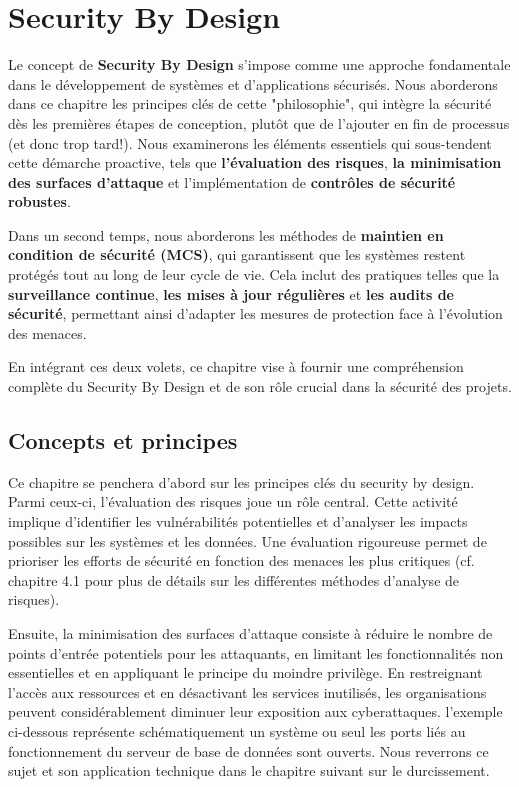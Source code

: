 \section{Security By Design}

Le concept de \textbf{Security By Design} s'impose comme une approche fondamentale dans le développement de systèmes et d'applications sécurisés. Nous aborderons dans ce chapitre les principes clés de cette "philosophie", qui intègre la sécurité dès les premières étapes de conception, plutôt que de l'ajouter en fin de processus (et donc trop tard!). Nous examinerons les éléments essentiels qui sous-tendent cette démarche proactive, tels que \textbf{l'évaluation des risques}, \textbf{la minimisation des surfaces d'attaque} et l'implémentation de \textbf{contrôles de sécurité robustes}.

Dans un second temps, nous aborderons les méthodes de \textbf{maintien en condition de sécurité (MCS)}, qui garantissent que les systèmes restent protégés tout au long de leur cycle de vie. Cela inclut des pratiques telles que la \textbf{surveillance continue}, \textbf{les mises à jour régulières} et \textbf{les audits de sécurité}, permettant ainsi d'adapter les mesures de protection face à l'évolution des menaces. 

En intégrant ces deux volets, ce chapitre vise à fournir une compréhension complète du Security By Design et de son rôle crucial dans la sécurité des projets.

\subsection{Concepts et principes}

Ce chapitre se penchera d'abord sur les principes clés du security by design. Parmi ceux-ci, l'évaluation des risques joue un rôle central. 
Cette activité implique d'identifier les vulnérabilités potentielles et d'analyser les impacts possibles sur les systèmes et les données. Une évaluation rigoureuse permet de prioriser les efforts de sécurité en fonction des menaces les plus critiques (cf. chapitre 4.1 pour plus de détails sur les différentes méthodes d'analyse de risques).

Ensuite, la minimisation des surfaces d'attaque consiste à réduire le nombre de points d'entrée potentiels pour les attaquants, en limitant les fonctionnalités non essentielles et en appliquant le principe du moindre privilège. En restreignant l'accès aux ressources et en désactivant les services inutilisés, les organisations peuvent considérablement diminuer leur exposition aux cyberattaques. l'exemple ci-dessous représente schématiquement un système ou seul les ports liés au fonctionnement du serveur de base de données sont ouverts. Nous reverrons ce sujet et son application technique dans le chapitre suivant sur le durcissement.


